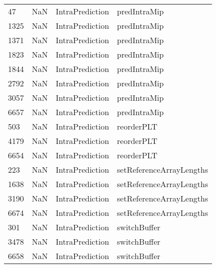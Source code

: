 \begin{tabular}{llll}
47   &                   NaN &            IntraPrediction &                              predIntraMip \\
1325 &                   NaN &            IntraPrediction &                              predIntraMip \\
1371 &                   NaN &            IntraPrediction &                              predIntraMip \\
1823 &                   NaN &            IntraPrediction &                              predIntraMip \\
1844 &                   NaN &            IntraPrediction &                              predIntraMip \\
2792 &                   NaN &            IntraPrediction &                              predIntraMip \\
3057 &                   NaN &            IntraPrediction &                              predIntraMip \\
6657 &                   NaN &            IntraPrediction &                              predIntraMip \\
503  &                   NaN &            IntraPrediction &                                reorderPLT \\
4179 &                   NaN &            IntraPrediction &                                reorderPLT \\
6654 &                   NaN &            IntraPrediction &                                reorderPLT \\
223  &                   NaN &            IntraPrediction &                  setReferenceArrayLengths \\
1638 &                   NaN &            IntraPrediction &                  setReferenceArrayLengths \\
3190 &                   NaN &            IntraPrediction &                  setReferenceArrayLengths \\
6674 &                   NaN &            IntraPrediction &                  setReferenceArrayLengths \\
301  &                   NaN &            IntraPrediction &                              switchBuffer \\
3478 &                   NaN &            IntraPrediction &                              switchBuffer \\
6658 &                   NaN &            IntraPrediction &                              switchBuffer \\

\end{tabular}
